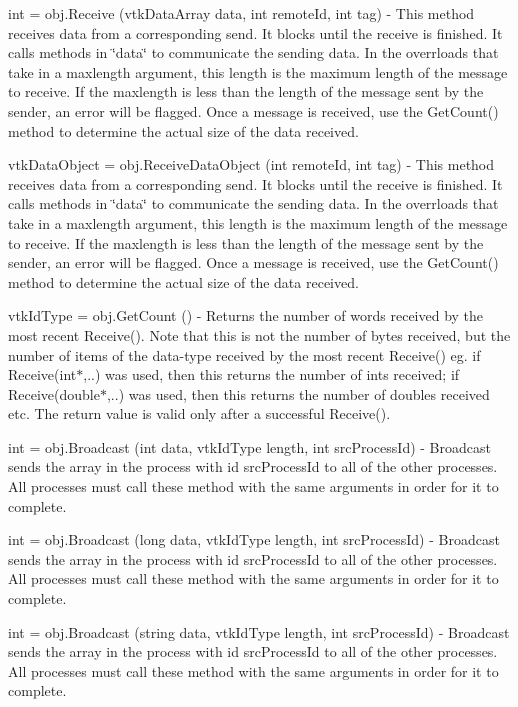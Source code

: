 \begin{DoxyItemize}
\item {\ttfamily int = obj.\-Receive (vtk\-Data\-Array data, int remote\-Id, int tag)} -\/ This method receives data from a corresponding send. It blocks until the receive is finished. It calls methods in \char`\"{}data\char`\"{} to communicate the sending data. In the overrloads that take in a {\ttfamily maxlength} argument, this length is the maximum length of the message to receive. If the maxlength is less than the length of the message sent by the sender, an error will be flagged. Once a message is received, use the Get\-Count() method to determine the actual size of the data received.  
\item {\ttfamily vtk\-Data\-Object = obj.\-Receive\-Data\-Object (int remote\-Id, int tag)} -\/ This method receives data from a corresponding send. It blocks until the receive is finished. It calls methods in \char`\"{}data\char`\"{} to communicate the sending data. In the overrloads that take in a {\ttfamily maxlength} argument, this length is the maximum length of the message to receive. If the maxlength is less than the length of the message sent by the sender, an error will be flagged. Once a message is received, use the Get\-Count() method to determine the actual size of the data received.  
\item {\ttfamily vtk\-Id\-Type = obj.\-Get\-Count ()} -\/ Returns the number of words received by the most recent Receive(). Note that this is not the number of bytes received, but the number of items of the data-\/type received by the most recent Receive() eg. if Receive(int$\ast$,..) was used, then this returns the number of ints received; if Receive(double$\ast$,..) was used, then this returns the number of doubles received etc. The return value is valid only after a successful Receive().  
\item {\ttfamily int = obj.\-Broadcast (int data, vtk\-Id\-Type length, int src\-Process\-Id)} -\/ Broadcast sends the array in the process with id {\ttfamily src\-Process\-Id} to all of the other processes. All processes must call these method with the same arguments in order for it to complete.  
\item {\ttfamily int = obj.\-Broadcast (long data, vtk\-Id\-Type length, int src\-Process\-Id)} -\/ Broadcast sends the array in the process with id {\ttfamily src\-Process\-Id} to all of the other processes. All processes must call these method with the same arguments in order for it to complete.  
\item {\ttfamily int = obj.\-Broadcast (string data, vtk\-Id\-Type length, int src\-Process\-Id)} -\/ Broadcast sends the array in the process with id {\ttfamily src\-Process\-Id} to all of the other processes. All processes must call these method with the same arguments in order for it to complete.  

\end{DoxyItemize}

